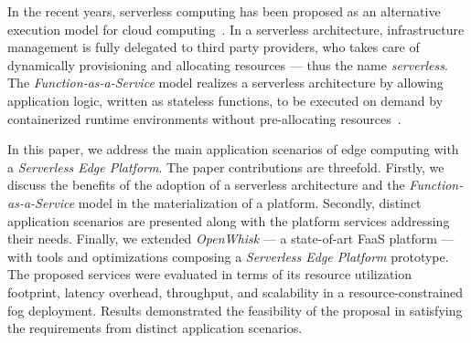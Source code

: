 





In the recent years, serverless computing has been proposed as an alternative execution model for cloud computing~\cite{Lloyd18serverless}. In a serverless architecture, infrastructure management is fully delegated to third party providers, who takes care of dynamically provisioning and allocating resources --- thus the name \textit{serverless}. The \textit{Function-as-a-Service} model realizes a serverless architecture by allowing application logic, written as stateless functions, to be executed on demand by containerized runtime environments without pre-allocating resources~\cite{Roberts:2018}. 

In this paper, we address the main application scenarios of edge computing with a \textit{Serverless Edge Platform}. The paper contributions are threefold. Firstly, we discuss the benefits of the adoption of a serverless architecture and the \textit{Function-as-a-Service} model in the materialization of a platform. Secondly, distinct application scenarios are presented along with 
the platform services addressing their needs. Finally, we extended \textit{OpenWhisk} --- a state-of-art FaaS platform --- with tools and optimizations composing a \textit{Serverless Edge Platform} prototype. 
The proposed services were evaluated in terms of its resource utilization footprint, latency overhead, throughput, and scalability in a resource-constrained fog deployment. Results demonstrated the feasibility of the proposal in satisfying the requirements from distinct application scenarios.


